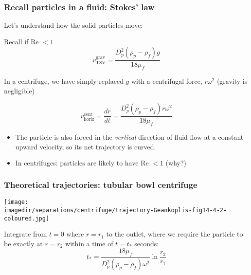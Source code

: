 \begin{frame}\frametitle{Recall particles in a fluid: Stokes' law}
	Let's understand how the solid particles move:
	\begin{exampleblock}{Recall  if Re $< 1$}
		\[
			v_\text{TSV}^\text{grav} = \frac{D_p^2 \left( \rho_p - \rho_f \right) g }{18 \mu_f} \label{TSV-low-Re}
		\]
	\end{exampleblock}
	In a centrifuge, we have simply replaced $g$ with a centrifugal force, $r \omega^2$ (gravity is negligible)
	\begin{exampleblock}{}
		\[
			v_\text{horiz}^\text{cent} = \frac{dr}{dt} = \frac{D_p^2\left(\rho_p - \rho_f\right)r\omega^2}{18 \mu_f}
		\]
	\end{exampleblock}
	\begin{itemize}
		\item	The particle is also forced in the \emph{vertical} direction of fluid flow at a constant upward velocity, so its net trajectory is curved.
		\item	In centrifuges: particles are likely to have Re $< 1$ (why?)
	\end{itemize}
\end{frame}

%
%


\begin{frame}\frametitle{Theoretical trajectories: tubular bowl centrifuge}
	\begin{center}
		\texttt{[image: \\imagedir/separations/centrifuge/trajectory-Geankoplis-fig14-4-2-coloured.jpg]}
	\end{center}
	Integrate from $t=0$ where $r=r_1$ to the outlet, where we require the particle to be exactly at $r=r_2$ within a time of $t=t_*$ seconds:
	\[
		t_* = \frac{18 \mu_f}{D_p^2\left(\rho_p - \rho_f\right)\omega^2} \ln \frac{r_2}{r_1}
	\]
\end{frame}

